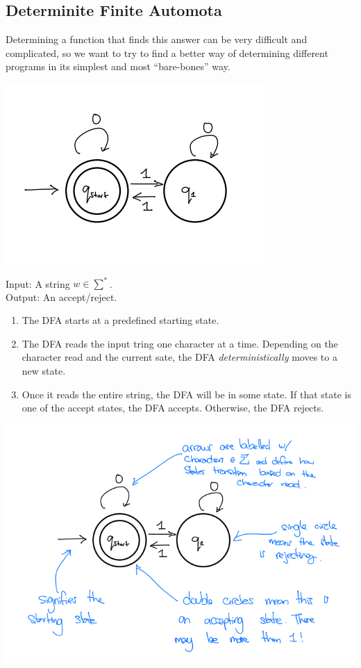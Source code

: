 \documentclass{article}
\begin{document}
\subsection{Determinite Finite Automota}
Determining a function that finds this answer can be very difficult and complicated, so we want to try to find a better way of determining different programs in its simplest and most ``bare-bones'' way.
    \begin{center}
        \includegraphics[scale=0.6]{imgs/finite-automota.png}
    \end{center}
    Input: A string $w \in \sum^*$.\\
    Output: An accept/reject.
    \begin{enumerate}
        \item The DFA starts at a predefined starting state.
        \item The DFA reads the input tring one character at a time. Depending on the character read and the current sate, the DFA \textit{deterministically} moves to a new state.
        \item Once it reads the entire string, the DFA will be in some state. If that state is one of the accept states, the DFA accepts. Otherwise, the DFA rejects.
    \end{enumerate}
    \begin{center}
        \includegraphics[scale=0.6]{imgs/finite-automota-labeled.png}
    \end{center}
\end{document}
